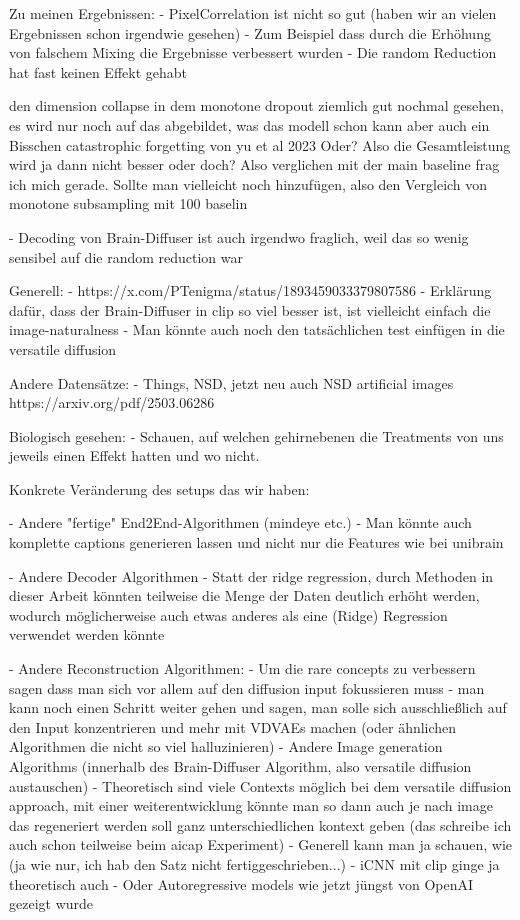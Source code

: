 Zu meinen Ergebnissen:
- PixelCorrelation ist nicht so gut (haben wir an vielen Ergebnissen schon irgendwie gesehen)
    - Zum Beispiel dass durch die Erhöhung von falschem Mixing die Ergebnisse verbessert wurden
    - Die random Reduction hat fast keinen Effekt gehabt


den dimension collapse in dem monotone dropout ziemlich gut nochmal gesehen, es wird nur noch auf das abgebildet, was das modell schon kann
aber auch ein Bisschen catastrophic forgetting von yu et al 2023
Oder?
Also die Gesamtleistung wird ja dann nicht besser oder doch?
Also verglichen mit der main baseline frag ich mich gerade.
Sollte man vielleicht noch hinzufügen, also den Vergleich von monotone subsampling mit 100 baselin

- Decoding von Brain-Diffuser ist auch irgendwo fraglich, weil das so wenig sensibel auf die random reduction war

Generell:
- https://x.com/PTenigma/status/1893459033379807586
- Erklärung dafür, dass der Brain-Diffuser in clip so viel besser ist, ist vielleicht einfach die image-naturalness
- Man könnte auch noch den tatsächlichen test einfügen in die versatile diffusion

Andere Datensätze:
- Things, NSD, jetzt neu auch NSD artificial images https://arxiv.org/pdf/2503.06286

Biologisch gesehen:
- Schauen, auf welchen gehirnebenen die Treatments von uns jeweils einen Effekt hatten und wo nicht.

Konkrete Veränderung des setups das wir haben:

- Andere "fertige" End2End-Algorithmen (mindeye etc.)
    - Man könnte auch komplette captions generieren lassen und nicht nur die Features wie bei unibrain \cite{maiUniBrainUnifyImage2023}

- Andere Decoder Algorithmen 
    - Statt der ridge regression, durch Methoden in dieser Arbeit könnten teilweise die Menge der Daten deutlich erhöht werden, wodurch möglicherweise auch etwas anderes als eine (Ridge) Regression verwendet werden könnte

- Andere Reconstruction Algorithmen:
    - Um die rare concepts zu verbessern sagen \cite{samuelGeneratingImagesRare2024} dass man sich vor allem auf den diffusion input fokussieren muss
        - man kann noch einen Schritt weiter gehen und sagen, man solle sich ausschließlich auf den Input konzentrieren und mehr mit VDVAEs machen (oder ähnlichen Algorithmen die nicht so viel halluzinieren)
    - Andere Image generation Algorithms (innerhalb des Brain-Diffuser Algorithm, also versatile diffusion austauschen)
    - Theoretisch sind viele Contexts möglich bei dem versatile diffusion approach, mit einer weiterentwicklung könnte man so dann auch je nach image das regeneriert werden soll ganz unterschiedlichen kontext geben (das schreibe ich auch schon teilweise beim aicap Experiment)
    - Generell kann man ja schauen, wie (ja wie nur, ich hab den Satz nicht fertiggeschrieben...)
    - iCNN mit clip ginge ja theoretisch auch
    - Oder Autoregressive models wie jetzt jüngst von OpenAI gezeigt wurde


